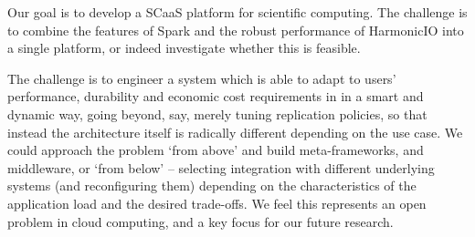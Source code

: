 \documentclass[conference]{IEEEtran}
\begin{document}

Our goal is to develop a SCaaS platform for %
scientific computing. The challenge is to combine the features of Spark and the robust performance of HarmonicIO into a single platform, or indeed investigate whether this is feasible. 


The challenge is to engineer a system which is able to adapt to users' performance, durability and economic cost requirements in in a smart and dynamic way, going beyond, say, merely tuning replication policies, so that instead the architecture itself is radically different depending on the use case. We could approach the problem `from above' and build meta-frameworks, and middleware,
or `from below' -- selecting integration with different underlying systems (and reconfiguring them) depending on the characteristics of the application load and the desired trade-offs. %
We feel this represents an open problem in cloud computing, and a key focus for our future research.






% 
% 


{
}
\end{document}
